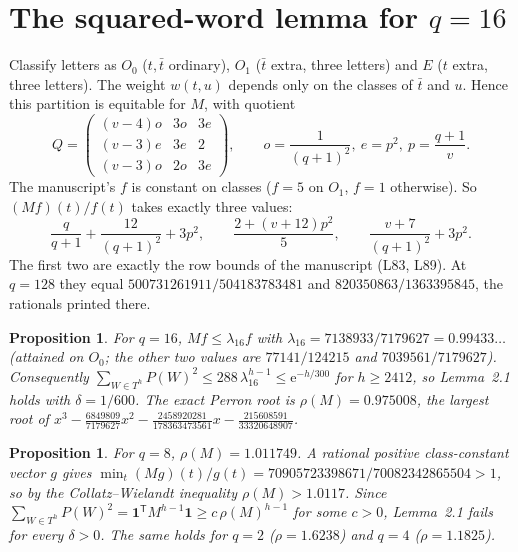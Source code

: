 \documentclass[11pt]{amsart}
\newcommand{\ee}{\mathrm e}
\newtheorem{proposition}[theorem]{Proposition}
\theoremstyle{remark}
\begin{document}
\section{The squared-word lemma for $q=16$}
Classify letters as $O_0$ ($t,\bar t$ ordinary), $O_1$ ($\bar t$ extra, three
letters) and $E$ ($t$ extra, three letters). The weight $w(t,u)$ depends only
on the classes of $\bar t$ and $u$. Hence this partition is equitable for
$M$, with quotient
\[
Q=\begin{pmatrix}(v-4)o&3o&3e\\(v-3)e&3e&2\\(v-3)o&2o&3e\end{pmatrix},\qquad
o=\frac1{(q+1)^2},\ e=p^2,\ p=\frac{q+1}{v}.
\]
The manuscript's $f$ is constant on classes ($f=5$ on $O_1$, $f=1$ otherwise).
So $(Mf)(t)/f(t)$ takes exactly three values:
\[
\frac q{q+1}+\frac{12}{(q+1)^2}+3p^2,\qquad
\frac{2+(v+12)p^2}5,\qquad
\frac{v+7}{(q+1)^2}+3p^2 .
\]
The first two are exactly the row bounds of the manuscript (L83, L89). At
$q=128$ they equal $500731261911/504183783481$ and $820350863/1363395845$,
the rationals printed there.

\begin{proposition}\label{prop:16}
For $q=16$, $Mf\le\lambda_{16}f$ with
$\lambda_{16}=7138933/7179627=0.99433\ldots$ (attained on $O_0$; the other
two values are $77141/124215$ and $7039561/7179627$). Consequently
$\sum_{W\in T^h}P(W)^2\le288\,\lambda_{16}^{h-1}\le\ee^{-h/300}$ for
$h\ge2412$, so Lemma~2.1 holds with $\delta=1/600$. The exact Perron root is
$\rho(M)=0.975008$, the largest root of
$x^3-\frac{6849809}{7179627}x^2-\frac{2458920281}{178363473561}x-\frac{215608591}{33320648907}$.
\end{proposition}

\begin{proposition}\label{prop:8}
For $q=8$, $\rho(M)=1.011749$. A rational positive class-constant vector $g$
gives $\min_t(Mg)(t)/g(t)=70905723398671/70082342865504>1$, so by the
Collatz--Wielandt inequality $\rho(M)>1.0117$. Since
$\sum_{W\in T^h}P(W)^2=\mathbf 1^{\mathsf T}M^{h-1}\mathbf 1\ge
c\,\rho(M)^{h-1}$ for some $c>0$, Lemma~2.1 fails for every $\delta>0$.
The same holds for $q=2$ ($\rho=1.6238$) and $q=4$ ($\rho=1.1825$).
\end{proposition}
\end{document}
